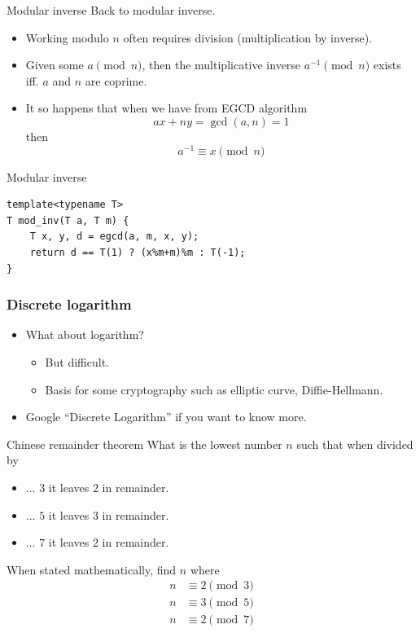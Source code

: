 \documentclass{beamer}
\begin{document}
\begin{frame}[plain]{Modular inverse}
  \vspace{20pt}
  Back to modular inverse.
  \begin{itemize}
    \item Working modulo $n$ often requires division (multiplication by inverse).
    \item Given some $a \pmod{n}$, then the multiplicative inverse $a^{-1}
      \pmod{n}$ exists iff. $a$ and $n$ are coprime.
    \item It so happens that when we have from EGCD algorithm
      \[
        ax + ny = \gcd(a,n) = 1
      \]
      then \[ a^{-1} \equiv x \pmod{n} \]
  \end{itemize}
\end{frame}

\begin{frame}{Modular inverse}
    \begin{verbatim}
template<typename T>
T mod_inv(T a, T m) {
    T x, y, d = egcd(a, m, x, y);
    return d == T(1) ? (x%m+m)%m : T(-1);
}
\end{verbatim}
\end{frame}

\begin{frame}[plain]
  \frametitle{Discrete logarithm}
  \vspace{30pt}
  \begin{itemize}
    \item What about logarithm? 
      \begin{itemize}
        \item But difficult.
        \item Basis for some cryptography such as elliptic curve, Diffie-Hellmann.
      \end{itemize}
    \item Google ``Discrete Logarithm'' if you want to know more.
  \end{itemize}
\end{frame}



\begin{frame}[plain]{Chinese remainder theorem}
  \vspace{20pt}
  What is the lowest number $n$ such that when divided by
  \vspace{10pt}
  \begin{itemize}
    \item[] ... $3$ it leaves $2$ in remainder.
    \item[] ... $5$ it leaves $3$ in remainder.
    \item[] ... $7$ it leaves $2$ in remainder.
  \end{itemize}
  \vspace{10pt}
  When stated mathematically, find $n$ where
      \begin{align*}
  n &\equiv 2 \pmod{3} \\
  n &\equiv 3 \pmod{5} \\
  n &\equiv 2 \pmod{7}
      \end{align*}
\end{frame}
\end{document}
